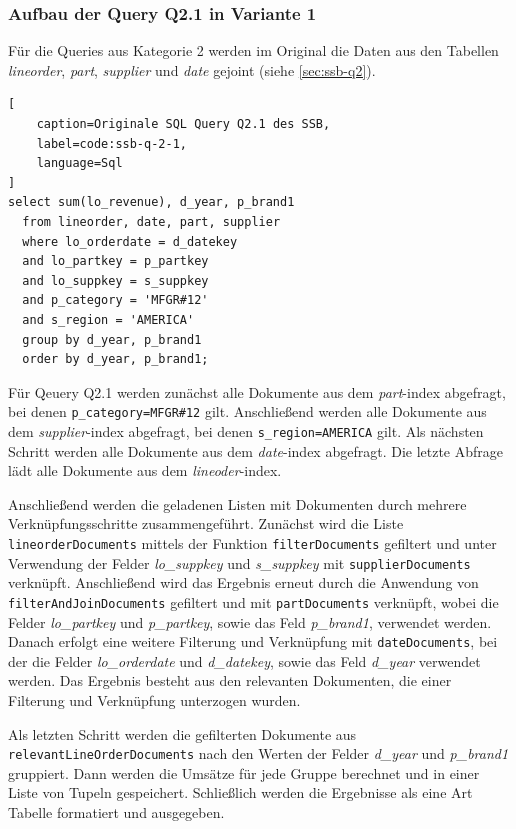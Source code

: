 \subsubsection{Aufbau der Query Q2.1 in Variante 1}
Für die Queries aus Kategorie 2 werden im Original die Daten aus den Tabellen \emph{lineorder}, \emph{part}, \emph{supplier} und \emph{date} gejoint (siehe \cref{sec:ssb-q2}).

\begin{lstlisting}[
    caption=Originale SQL Query Q2.1 des SSB,
    label=code:ssb-q-2-1,
    language=Sql
]
select sum(lo_revenue), d_year, p_brand1
  from lineorder, date, part, supplier
  where lo_orderdate = d_datekey
  and lo_partkey = p_partkey
  and lo_suppkey = s_suppkey
  and p_category = 'MFGR#12'
  and s_region = 'AMERICA'
  group by d_year, p_brand1
  order by d_year, p_brand1;
\end{lstlisting}


Für Qeuery Q2.1 werden zunächst alle Dokumente aus dem \emph{part}-index abgefragt, bei denen \lstinline|p_category=MFGR#12| gilt.
Anschließend werden alle Dokumente aus dem \emph{supplier}-index abgefragt, bei denen \lstinline|s_region=AMERICA| gilt.
Als nächsten Schritt werden alle Dokumente aus dem \emph{date}-index abgefragt. Die letzte Abfrage lädt alle Dokumente aus dem \emph{lineoder}-index.

Anschließend werden die geladenen Listen mit Dokumenten durch mehrere Verknüpfungsschritte zusammengeführt.
Zunächst wird die Liste \lstinline|lineorderDocuments| mittels der Funktion \lstinline|filterDocuments| gefiltert und unter Verwendung der Felder \emph{lo\_suppkey} und \emph{s\_suppkey} mit \lstinline|supplierDocuments| verknüpft.
Anschließend wird das Ergebnis erneut durch die Anwendung von \lstinline|filterAndJoinDocuments| gefiltert und mit \lstinline|partDocuments| verknüpft, wobei die Felder \emph{lo\_partkey} und \emph{p\_partkey}, sowie das Feld \emph{p\_brand1}, verwendet werden.\\
Danach erfolgt eine weitere Filterung und Verknüpfung mit \lstinline|dateDocuments|, bei der die Felder \emph{lo\_orderdate} und \emph{d\_datekey}, sowie das Feld \emph{d\_year} verwendet werden.
Das Ergebnis besteht aus den relevanten Dokumenten, die einer Filterung und Verknüpfung unterzogen wurden.

Als letzten Schritt werden die gefilterten Dokumente aus \lstinline|relevantLineOrderDocuments| nach den Werten der Felder \emph{d\_year} und \emph{p\_brand1} gruppiert.
Dann werden die Umsätze für jede Gruppe berechnet und in einer Liste von Tupeln gespeichert.
Schließlich werden die Ergebnisse als eine Art Tabelle formatiert und ausgegeben.


